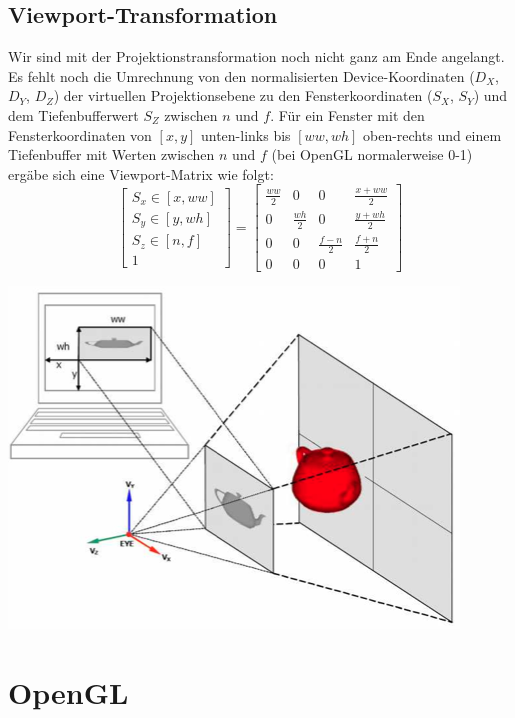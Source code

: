 \documentclass[10pt]{article}
\begin{document}
\subsection{Viewport-Transformation}
Wir sind mit der Projektionstransformation noch nicht ganz am Ende angelangt. Es fehlt noch die Umrechnung von den normalisierten Device-Koordinaten ($D_X$, $D_Y$, $D_Z$) der virtuellen Projektionsebene zu den Fensterkoordinaten ($S_X$, $S_Y$) und dem Tiefenbufferwert $S_Z$ zwischen $n$ und $f$. Für ein Fenster mit den Fensterkoordinaten von $[x, y]$ unten-links bis $[ww, wh]$ oben-rechts und einem Tiefenbuffer mit Werten zwischen $n$ und $f$ (bei OpenGL normalerweise 0-1) ergäbe sich eine Viewport-Matrix wie folgt:
\begin{equation}
\begin{bmatrix}
S_x \in [x, ww] \\
S_y \in [y, wh] \\
S_z \in [n, f] \\
1
\end{bmatrix} = \begin{bmatrix}
\frac{ww}{2} & 0 & 0 & \frac{x + ww}{2} \\
0 & \frac{wh}{2} & 0 & \frac{y + wh}{2} \\
0 & 0 & \frac{f - n}{2} & \frac{f + n}{2} \\
0 & 0 & 0 & 1
\end{bmatrix}
\end{equation}
\begin{center}
	\includegraphics[scale=0.5]{viewport_transformation.png}
\end{center}

\newpage
\section{OpenGL}
\end{document}
